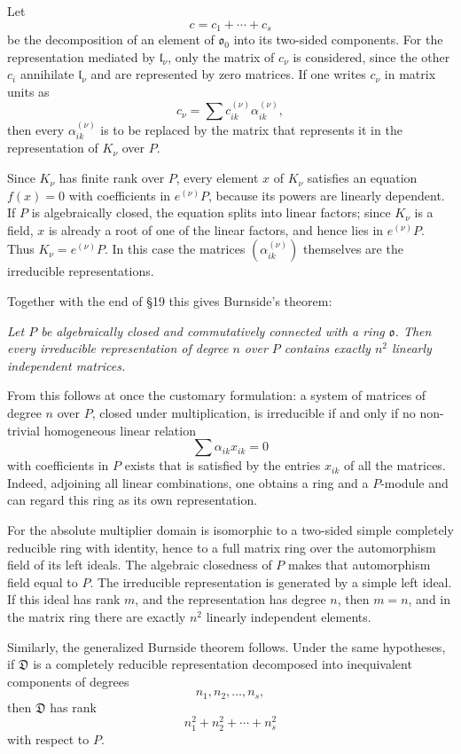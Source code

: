 \documentclass[11pt]{article}
\providecommand{\mo}{\mathfrak{o}}
\providecommand{\ml}{\mathfrak{l}}
\begin{document}
Let
\[
        c=c_1+\cdots+c_s
\]
be the decomposition of an element of $\mo_0$ into its two-sided components. For the representation mediated by $\ml_\nu$, only the matrix of $c_\nu$ is considered, since the other $c_i$ annihilate $\ml_\nu$ and are represented by zero matrices. If one writes $c_\nu$ in matrix units as
\[
        c_\nu=\sum c_{ik}^{(\nu)}\alpha_{ik}^{(\nu)},
\]
then every $\alpha_{ik}^{(\nu)}$ is to be replaced by the matrix that represents it in the representation of $K_\nu$ over $P$.

Since $K_\nu$ has finite rank over $P$, every element $x$ of $K_\nu$ satisfies an equation $f(x)=0$ with coefficients in $e^{(\nu)}P$, because its powers are linearly dependent. If $P$ is algebraically closed, the equation splits into linear factors; since $K_\nu$ is a field, $x$ is already a root of one of the linear factors, and hence lies in $e^{(\nu)}P$. Thus $K_\nu=e^{(\nu)}P$. In this case the matrices $(\alpha_{ik}^{(\nu)})$ themselves are the irreducible representations.

Together with the end of §19 this gives Burnside's theorem:

\emph{Let $P$ be algebraically closed and commutatively connected with a ring $\mo$. Then every irreducible representation of degree $n$ over $P$ contains exactly $n^2$ linearly independent matrices.}

From this follows at once the customary formulation: a system of matrices of degree $n$ over $P$, closed under multiplication, is irreducible if and only if no non-trivial homogeneous linear relation
\[
        \sum \alpha_{ik}x_{ik}=0
\]
with coefficients in $P$ exists that is satisfied by the entries $x_{ik}$ of all the matrices. Indeed, adjoining all linear combinations, one obtains a ring and a $P$-module and can regard this ring as its own representation.

For the absolute multiplier domain is isomorphic to a two-sided simple completely reducible ring with identity, hence to a full matrix ring over the automorphism field of its left ideals. The algebraic closedness of $P$ makes that automorphism field equal to $P$. The irreducible representation is generated by a simple left ideal. If this ideal has rank $m$, and the representation has degree $n$, then $m=n$, and in the matrix ring there are exactly $n^2$ linearly independent elements.

Similarly, the generalized Burnside theorem follows. Under the same hypotheses, if $\mathfrak D$ is a completely reducible representation decomposed into inequivalent components of degrees
\[
        n_1,n_2,\ldots,n_s,
\]
then $\mathfrak D$ has rank
\[
        n_1^2+n_2^2+\cdots+n_s^2
\]
with respect to $P$.
\end{document}
